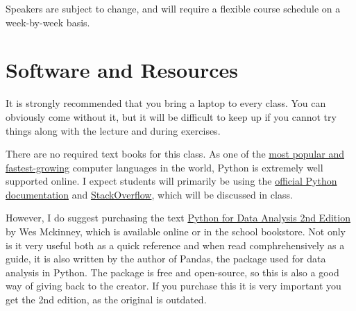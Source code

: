 \documentclass{article}
\begin{document}
\noindent Speakers are subject to change, and will require a flexible course schedule on a week-by-week basis.


\section*{Software and Resources}
It is strongly recommended that you bring a laptop to every class.  You can obviously come without it, but it will be difficult to keep up if you cannot try things along with the lecture and during exercises.

There are no required text books for this class.  As one of the \href{https://insights.stackoverflow.com/survey/2018/\#technology}{most popular and fastest-growing} computer languages in the world, Python is extremely well supported online.  I expect students will primarily be using the \href{https://docs.python.org/3/}{official Python documentation} and \href{https://stackoverflow.com/}{StackOverflow}, which will be discussed in class.  

However, I do suggest purchasing the text \href{https://www.amazon.com/Python-Data-Analysis-Wrangling-IPython/dp/1491957662/ref=sr_1_3?ie=UTF8\&qid=1550574627\&sr=8-3\&keywords=python+for+data+analysis+2nd}{Python for Data Analysis 2nd Edition} by Wes Mckinney, which is available online or in the school bookstore.  Not only is it very useful both as a quick reference and when read comphrehensively as a guide, it is also written by the author of Pandas, the package used for data analysis in Python.  The package is free and open-source, so this is also a good way of giving back to the creator.  If you purchase this it is very important you get the 2nd edition, as the original is outdated.
\end{document}
